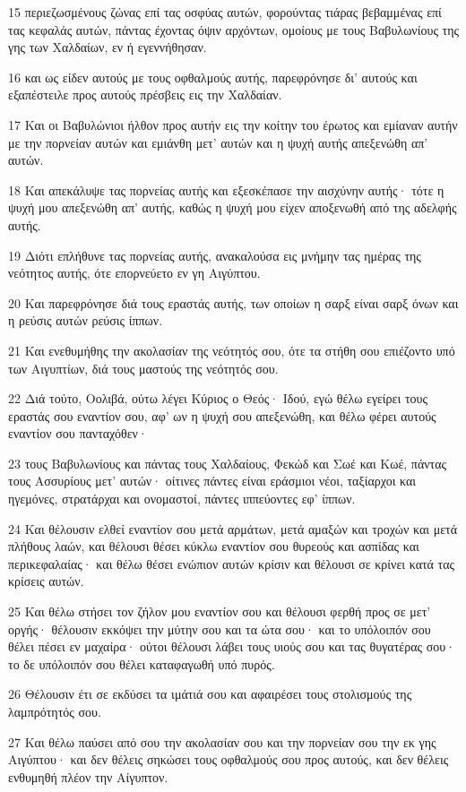 \par 15 περιεζωσμένους ζώνας επί τας οσφύας αυτών, φορούντας τιάρας βεβαμμένας επί τας κεφαλάς αυτών, πάντας έχοντας όψιν αρχόντων, ομοίους με τους Βαβυλωνίους της γης των Χαλδαίων, εν ή εγεννήθησαν.
\par 16 και ως είδεν αυτούς με τους οφθαλμούς αυτής, παρεφρόνησε δι' αυτούς και εξαπέστειλε προς αυτούς πρέσβεις εις την Χαλδαίαν.
\par 17 Και οι Βαβυλώνιοι ήλθον προς αυτήν εις την κοίτην του έρωτος και εμίαναν αυτήν με την πορνείαν αυτών και εμιάνθη μετ' αυτών και η ψυχή αυτής απεξενώθη απ' αυτών.
\par 18 Και απεκάλυψε τας πορνείας αυτής και εξεσκέπασε την αισχύνην αυτής· τότε η ψυχή μου απεξενώθη απ' αυτής, καθώς η ψυχή μου είχεν αποξενωθή από της αδελφής αυτής.
\par 19 Διότι επλήθυνε τας πορνείας αυτής, ανακαλούσα εις μνήμην τας ημέρας της νεότητος αυτής, ότε επορνεύετο εν γη Αιγύπτου.
\par 20 Και παρεφρόνησε διά τους εραστάς αυτής, των οποίων η σαρξ είναι σαρξ όνων και η ρεύσις αυτών ρεύσις ίππων.
\par 21 Και ενεθυμήθης την ακολασίαν της νεότητός σου, ότε τα στήθη σου επιέζοντο υπό των Αιγυπτίων, διά τους μαστούς της νεότητός σου.
\par 22 Διά τούτο, Οολιβά, ούτω λέγει Κύριος ο Θεός· Ιδού, εγώ θέλω εγείρει τους εραστάς σου εναντίον σου, αφ' ων η ψυχή σου απεξενώθη, και θέλω φέρει αυτούς εναντίον σου πανταχόθεν·
\par 23 τους Βαβυλωνίους και πάντας τους Χαλδαίους, Φεκώδ και Σωέ και Κωέ, πάντας τους Ασσυρίους μετ' αυτών· οίτινες πάντες είναι εράσμιοι νέοι, ταξίαρχοι και ηγεμόνες, στρατάρχαι και ονομαστοί, πάντες ιππεύοντες εφ' ίππων.
\par 24 Και θέλουσιν ελθεί εναντίον σου μετά αρμάτων, μετά αμαξών και τροχών και μετά πλήθους λαών, και θέλουσι θέσει κύκλω εναντίον σου θυρεούς και ασπίδας και περικεφαλαίας· και θέλω θέσει ενώπιον αυτών κρίσιν και θέλουσι σε κρίνει κατά τας κρίσεις αυτών.
\par 25 Και θέλω στήσει τον ζήλον μου εναντίον σου και θέλουσι φερθή προς σε μετ' οργής· θέλουσιν εκκόψει την μύτην σου και τα ώτα σου· και το υπόλοιπόν σου θέλει πέσει εν μαχαίρα· ούτοι θέλουσι λάβει τους υιούς σου και τας θυγατέρας σου· το δε υπόλοιπόν σου θέλει καταφαγωθή υπό πυρός.
\par 26 Θέλουσιν έτι σε εκδύσει τα ιμάτιά σου και αφαιρέσει τους στολισμούς της λαμπρότητός σου.
\par 27 Και θέλω παύσει από σου την ακολασίαν σου και την πορνείαν σου την εκ γης Αιγύπτου· και δεν θέλεις σηκώσει τους οφθαλμούς σου προς αυτούς, και δεν θέλεις ενθυμηθή πλέον την Αίγυπτον.

